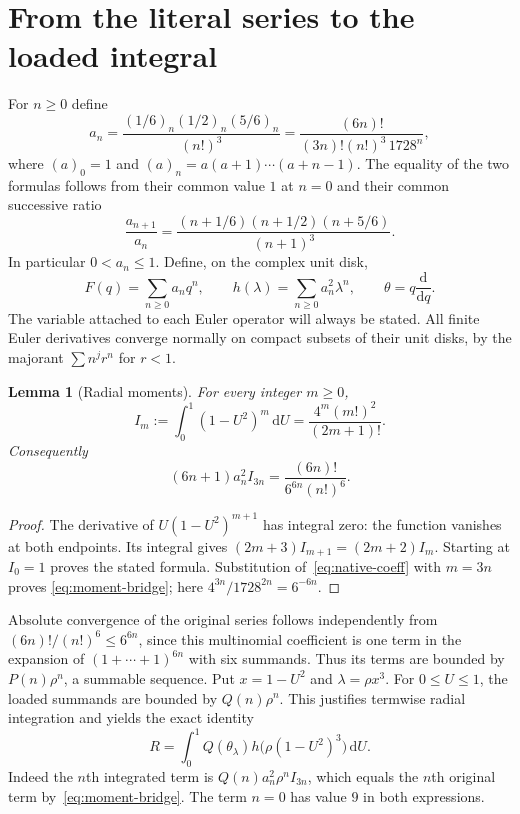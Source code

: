 \documentclass[11pt,a4paper]{article}
\newtheorem{lemma}[theorem]{Lemma}
\newcommand{\dd}{\mathrm d}
\begin{document}
\section{From the literal series to the loaded integral}
For $n\geq0$ define
\begin{equation}\label{eq:native-coeff}
 a_n=\frac{(1/6)_n(1/2)_n(5/6)_n}{(n!)^3}
     =\frac{(6n)!}{(3n)!(n!)^3\,1728^n},
\end{equation}
where $(a)_0=1$ and $(a)_n=a(a+1)\cdots(a+n-1)$.
The equality of the two formulas follows from their common value $1$ at
$n=0$ and their common successive ratio
\begin{equation}\label{eq:native-ratio}
 \frac{a_{n+1}}{a_n}
 =\frac{(n+1/6)(n+1/2)(n+5/6)}{(n+1)^3}.
\end{equation}
In particular $0<a_n\leq1$. Define, on the complex unit disk,
\begin{equation}\label{eq:series}
 F(q)=\sum_{n\geq0}a_nq^n,\qquad
 h(\lambda)=\sum_{n\geq0}a_n^2\lambda^n,\qquad
 \theta=q\frac{\dd}{\dd q}.
\end{equation}
The variable attached to each Euler operator will always be stated.
All finite Euler derivatives converge normally on compact subsets of their
unit disks, by the majorant $\sum n^j r^n$ for $r<1$.

\begin{lemma}[Radial moments]\label{lem:moments}
For every integer $m\geq0$,
\[
 I_m:=\int_0^1(1-U^2)^m\,\dd U
     =\frac{4^m(m!)^2}{(2m+1)!}.
\]
Consequently
\begin{equation}\label{eq:moment-bridge}
 (6n+1)a_n^2 I_{3n}=
       \frac{(6n)!}{6^{6n}(n!)^6}.
\end{equation}
\end{lemma}
\begin{proof}
The derivative of $U(1-U^2)^{m+1}$ has integral zero: the function
vanishes at both endpoints. Its integral gives
$(2m+3)I_{m+1}=(2m+2)I_m$. Starting at $I_0=1$ proves the stated formula.
Substitution of~\eqref{eq:native-coeff} with $m=3n$ proves
\eqref{eq:moment-bridge}; here $4^{3n}/1728^{2n}=6^{-6n}$.
\end{proof}

Absolute convergence of the original series follows independently from
$(6n)!/(n!)^6\leq6^{6n}$, since this multinomial coefficient is one term
in the expansion of $(1+\cdots+1)^{6n}$ with six summands. Thus its terms
are bounded by $P(n)\rho^n$, a summable sequence.
Put $x=1-U^2$ and $\lambda=\rho x^3$. For $0\leq U\leq1$,
the loaded summands are bounded by $Q(n)\rho^n$. This justifies
termwise radial integration and yields the exact identity
\begin{equation}\label{eq:radial}
 R=\int_0^1Q(\theta_\lambda)h\bigl(\rho(1-U^2)^3\bigr)\,\dd U.
\end{equation}
Indeed the $n$th integrated term is $Q(n)a_n^2\rho^nI_{3n}$,
which equals the $n$th original term by~\eqref{eq:moment-bridge}.
The term $n=0$ has value $9$ in both expressions.
\end{document}
